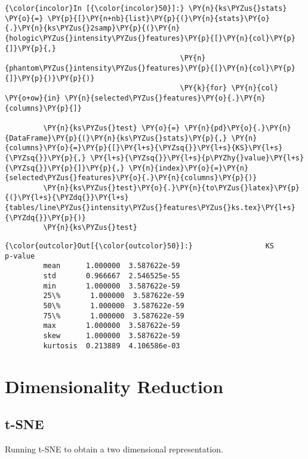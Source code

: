    \begin{Verbatim}[commandchars=\\\{\}]
{\color{incolor}In [{\color{incolor}50}]:} \PY{n}{ks\PYZus{}stats} \PY{o}{=} \PY{p}{[}\PY{n+nb}{list}\PY{p}{(}\PY{n}{stats}\PY{o}{.}\PY{n}{ks\PYZus{}2samp}\PY{p}{(}\PY{n}{hologic\PYZus{}intensity\PYZus{}features}\PY{p}{[}\PY{n}{col}\PY{p}{]}\PY{p}{,}
                                         \PY{n}{phantom\PYZus{}intensity\PYZus{}features}\PY{p}{[}\PY{n}{col}\PY{p}{]}\PY{p}{)}\PY{p}{)}
                                         \PY{k}{for} \PY{n}{col} \PY{o+ow}{in} \PY{n}{selected\PYZus{}features}\PY{o}{.}\PY{n}{columns}\PY{p}{]}

         \PY{n}{ks\PYZus{}test} \PY{o}{=} \PY{n}{pd}\PY{o}{.}\PY{n}{DataFrame}\PY{p}{(}\PY{n}{ks\PYZus{}stats}\PY{p}{,} \PY{n}{columns}\PY{o}{=}\PY{p}{[}\PY{l+s}{\PYZsq{}}\PY{l+s}{KS}\PY{l+s}{\PYZsq{}}\PY{p}{,} \PY{l+s}{\PYZsq{}}\PY{l+s}{p\PYZhy{}value}\PY{l+s}{\PYZsq{}}\PY{p}{]}\PY{p}{,} \PY{n}{index}\PY{o}{=}\PY{n}{selected\PYZus{}features}\PY{o}{.}\PY{n}{columns}\PY{p}{)}
         \PY{n}{ks\PYZus{}test}\PY{o}{.}\PY{n}{to\PYZus{}latex}\PY{p}{(}\PY{l+s}{\PYZdq{}}\PY{l+s}{tables/line\PYZus{}intensity\PYZus{}features\PYZus{}ks.tex}\PY{l+s}{\PYZdq{}}\PY{p}{)}
         \PY{n}{ks\PYZus{}test}
\end{Verbatim}

            \begin{Verbatim}[commandchars=\\\{\}]
{\color{outcolor}Out[{\color{outcolor}50}]:}                 KS       p-value
         mean      1.000000  3.587622e-59
         std       0.966667  2.546525e-55
         min       1.000000  3.587622e-59
         25\%       1.000000  3.587622e-59
         50\%       1.000000  3.587622e-59
         75\%       1.000000  3.587622e-59
         max       1.000000  3.587622e-59
         skew      1.000000  3.587622e-59
         kurtosis  0.213889  4.106586e-03
\end{Verbatim}

    \section{Dimensionality Reduction}\label{dimensionality-reduction}

\subsection{t-SNE}\label{t-sne}

Running t-SNE to obtain a two dimensional representation.

